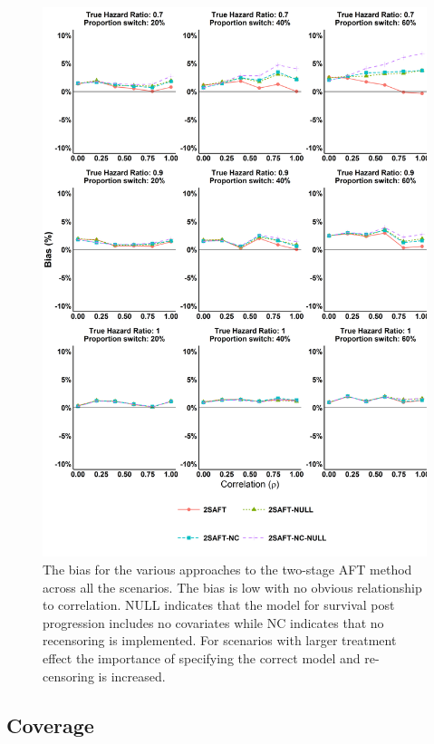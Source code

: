 \begin{figure}[ht]
\centering
\includegraphics[width=13cm]{images/chap_sim2/2saft_bias.png}
\caption{\label{F:chap_sim2:2saft_bias} The bias for the various approaches to the two-stage AFT method across all the scenarios. The bias is low with no obvious relationship to correlation. NULL indicates that the model for survival post progression includes no covariates while NC indicates that no recensoring is implemented. For scenarios with larger treatment effect the importance of specifying the correct model and re-censoring is increased.} 
\end{figure}


\clearpage

\subsection{Coverage}


